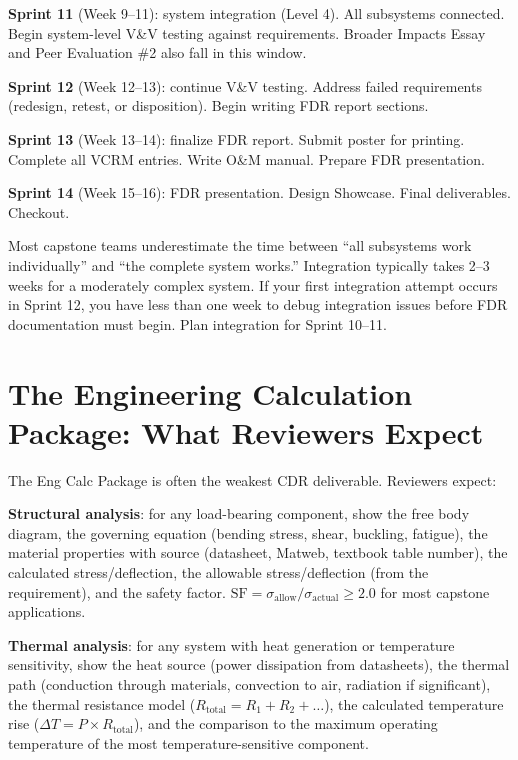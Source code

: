 \textbf{Sprint 11} (Week 9--11): system integration (Level 4). All subsystems connected. Begin system-level V\&V testing against requirements. Broader Impacts Essay and Peer Evaluation \#2 also fall in this window.

\textbf{Sprint 12} (Week 12--13): continue V\&V testing. Address failed requirements (redesign, retest, or disposition). Begin writing FDR report sections.

\textbf{Sprint 13} (Week 13--14): finalize FDR report. Submit poster for printing. Complete all VCRM entries. Write O\&M manual. Prepare FDR presentation.

\textbf{Sprint 14} (Week 15--16): FDR presentation. Design Showcase. Final deliverables. Checkout.

\begin{warningbox}
Most capstone teams underestimate the time between ``all subsystems work individually'' and ``the complete system works.'' Integration typically takes 2--3 weeks for a moderately complex system. If your first integration attempt occurs in Sprint 12, you have less than one week to debug integration issues before FDR documentation must begin. Plan integration for Sprint 10--11.
\end{warningbox}



\section{The Engineering Calculation Package: What Reviewers Expect}
The Eng Calc Package is often the weakest CDR deliverable. Reviewers expect:

\textbf{Structural analysis}: for any load-bearing component, show the free body diagram, the governing equation (bending stress, shear, buckling, fatigue), the material properties with source (datasheet, Matweb, textbook table number), the calculated stress/deflection, the allowable stress/deflection (from the requirement), and the safety factor. $\text{SF} = \sigma_{\text{allow}} / \sigma_{\text{actual}} \geq 2.0$ for most capstone applications.

\textbf{Thermal analysis}: for any system with heat generation or temperature sensitivity, show the heat source (power dissipation from datasheets), the thermal path (conduction through materials, convection to air, radiation if significant), the thermal resistance model ($R_{\text{total}} = R_1 + R_2 + \ldots$), the calculated temperature rise ($\Delta T = P \times R_{\text{total}}$), and the comparison to the maximum operating temperature of the most temperature-sensitive component.

